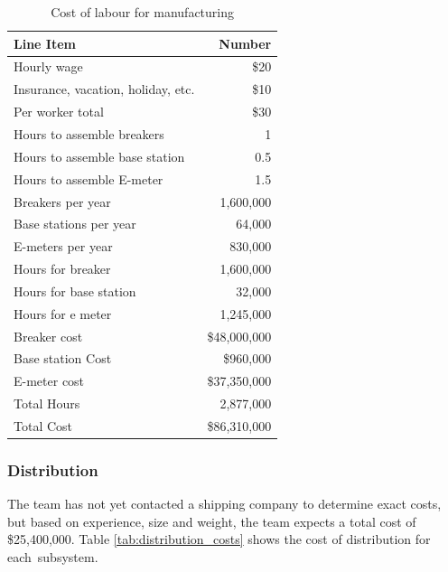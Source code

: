 \begin{table}[htdp]
\caption{Cost of labour for manufacturing}
\begin{center}
\begin{tabular}{|l|r|}\hline\rowcolor{lightgray}
Line Item & Number\\\hline
Hourly wage                                          & \$20\\\hline
Insurance, vacation, holiday, etc.	& \$10\\\hline
Per worker total	                            & \$30\\\hline
Hours to assemble breakers	         & 1\\\hline
Hours to assemble base station	& 0.5\\\hline
Hours to assemble E-meter	         & 1.5\\\hline
Breakers per year	                           &1,600,000\\\hline
Base stations per year	                  & 64,000\\\hline
E-meters per year	                           & 830,000\\\hline
Hours for breaker	                           &1,600,000\\\hline
Hours for base station	                  & 32,000\\\hline
Hours for e meter	                           & 1,245,000\\\hline
Breaker cost	                                    & \$48,000,000\\\hline
Base station Cost	                           & \$960,000\\\hline
E-meter cost	                                    & \$37,350,000\\\hline\hline
	 
Total Hours	                                    & 2,877,000\\\hline
Total Cost	                                              & \$86,310,000\\\hline
\end{tabular}
\end{center}
\label{tab:labour_manufacture}
\end{table}%

\clearpage
\subsubsection{Distribution}
The team has not yet contacted a shipping company to determine exact costs, but based on experience, size and weight, the team expects a total cost of \$25,400,000. Table \ref{tab:distribution_costs} shows the cost of distribution for each~subsystem. 

